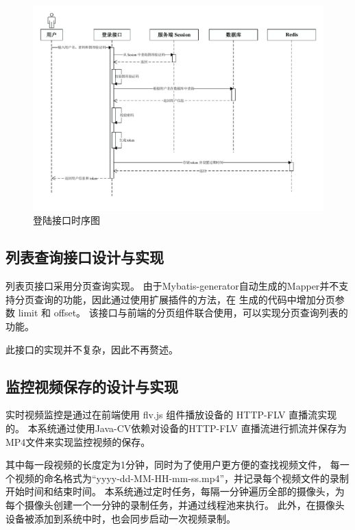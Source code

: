 \begin{figure}[ht]
    \centering
    \includegraphics[width=0.9\linewidth]{./Figure/IMG_login_seq.pdf}
    \caption{登陆接口时序图}\label{Fig:login_seq}
\end{figure}

\subsection{列表查询接口设计与实现}
列表页接口采用分页查询实现。
由于Mybatis-generator自动生成的Mapper并不支持分页查询的功能，因此通过使用扩展插件的方法，在
生成的代码中增加分页参数 limit 和 offset。
该接口与前端的分页组件联合使用，可以实现分页查询列表的功能。

此接口的实现并不复杂，因此不再赘述。

\subsection{监控视频保存的设计与实现}
实时视频监控是通过在前端使用 flv.js 组件播放设备的 HTTP-FLV 直播流实现的。
本系统通过使用Java-CV依赖对设备的HTTP-FLV 直播流进行抓流并保存为MP4文件来实现监控视频的保存。

其中每一段视频的长度定为1分钟，同时为了使用户更方便的查找视频文件，
每一个视频的命名格式为“yyyy-dd-MM-HH-mm-ss.mp4”，并记录每个视频文件的录制开始时间和结束时间。
本系统通过定时任务，每隔一分钟遍历全部的摄像头，为每个摄像头创建一个一分钟的录制任务，并通过线程池来执行。
此外，在摄像头设备被添加到系统中时，也会同步启动一次视频录制。

